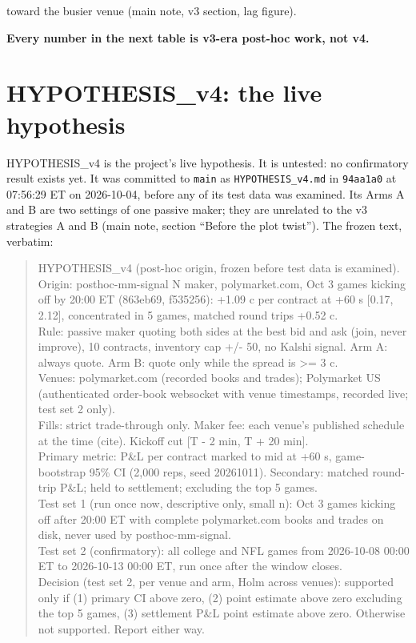 \documentclass[11pt]{article}
\begin{document}
toward the busier venue (main note, v3 section, lag figure).

\textbf{Every number in the next table is v3-era post-hoc work, not v4.}


\section{HYPOTHESIS\_v4: the live hypothesis}\label{app:v4}

HYPOTHESIS\_v4 is the project's live hypothesis. It is untested: no confirmatory result exists yet. It was committed to \texttt{main} as \texttt{HYPOTHESIS\_v4.md} in \texttt{94aa1a0} at 07:56:29 ET on 2026-10-04, before any of its test data was examined. Its Arms A and B are two settings of one passive maker; they are unrelated to the v3 strategies A and B (main note, section ``Before the plot twist''). The frozen text, verbatim:

\begin{quote}\small
HYPOTHESIS\_v4 (post-hoc origin, frozen before test data is examined).\\
Origin: posthoc-mm-signal N maker, polymarket.com, Oct 3 games kicking off by 20:00 ET (863eb69, f535256): +1.09 c per contract at +60 s [0.17, 2.12], concentrated in 5 games, matched round trips +0.52 c.\\
Rule: passive maker quoting both sides at the best bid and ask (join, never improve), 10 contracts, inventory cap +/- 50, no Kalshi signal. Arm A: always quote. Arm B: quote only while the spread is >= 3 c.\\
Venues: polymarket.com (recorded books and trades); Polymarket US (authenticated order-book websocket with venue timestamps, recorded live; test set 2 only).\\
Fills: strict trade-through only. Maker fee: each venue's published schedule at the time (cite). Kickoff cut [T - 2 min, T + 20 min].\\
Primary metric: P\&L per contract marked to mid at +60 s, game-bootstrap 95\% CI (2,000 reps, seed 20261011). Secondary: matched round-trip P\&L; held to settlement; excluding the top 5 games.\\
Test set 1 (run once now, descriptive only, small n): Oct 3 games kicking off after 20:00 ET with complete polymarket.com books and trades on disk, never used by posthoc-mm-signal.\\
Test set 2 (confirmatory): all college and NFL games from 2026-10-08 00:00 ET to 2026-10-13 00:00 ET, run once after the window closes.\\
Decision (test set 2, per venue and arm, Holm across venues): supported only if (1) primary CI above zero, (2) point estimate above zero excluding the top 5 games, (3) settlement P\&L point estimate above zero. Otherwise not supported. Report either way.
\end{quote}
\end{document}
